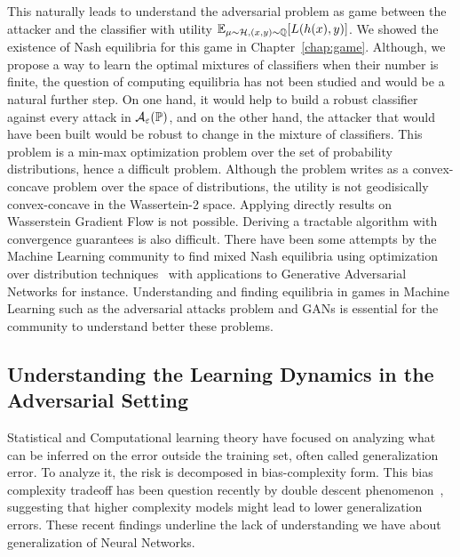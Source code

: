 This naturally leads to understand the adversarial problem as game between the attacker and the classifier with utility $\mathbb{E}_{\mu\sim\mathcal{H},(x,y)\sim\QQ}\left[L(h(x),y)\right]$. We showed the existence of Nash equilibria for this game in Chapter~\ref{chap:game}. Although, we propose a way to learn the optimal mixtures of classifiers when their number is finite, the question of  computing equilibria has not been studied and would be a natural further step. On one hand, it would help to build a robust classifier against every attack in $\mathcal{A}_\varepsilon(\mathbb{P})$, and on the other hand, the  attacker that would have been built would be robust to change in the mixture of classifiers. This problem is a min-max optimization problem over the set of probability distributions, hence a difficult problem. Although the problem writes as a convex-concave problem over the space of distributions, the utility is not geodisically convex-concave in the Wassertein-2 space. Applying directly results on Wasserstein Gradient Flow is not possible. Deriving a tractable algorithm with convergence guarantees is also difficult. There have been some attempts by the Machine Learning community to  find mixed Nash equilibria using optimization over distribution techniques~\citep{hsieh2019finding,domingo2020mean} with applications to Generative Adversarial Networks for instance. Understanding and finding equilibria in games  in Machine Learning such as the adversarial attacks problem and GANs is essential for the community to understand better these problems. 





\subsection{Understanding the Learning Dynamics in the Adversarial Setting}
Statistical and Computational learning theory have focused on analyzing what can be inferred on the error outside the training set, often called generalization error. To analyze it, the risk is decomposed in bias-complexity form. This bias complexity tradeoff has been question recently by double descent phenomenon~\citep{belkin2018overfitting,belkin2019reconciling}, suggesting that higher complexity models might lead to lower generalization errors. These recent findings underline the lack of understanding we have about generalization of Neural Networks.

